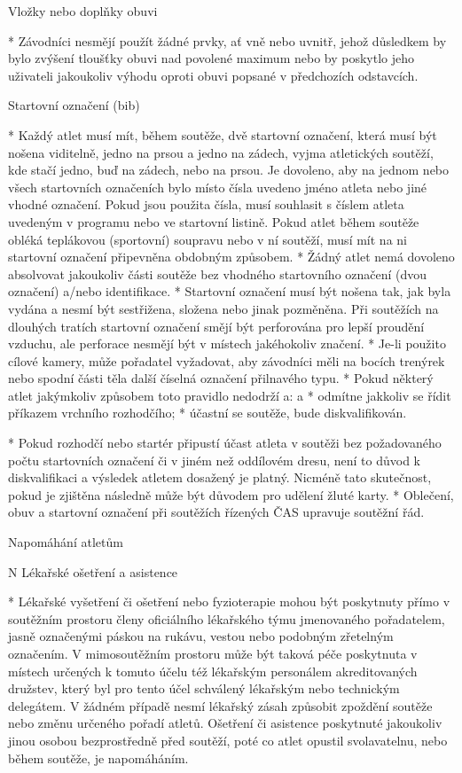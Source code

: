 Vložky nebo doplňky obuvi

* Závodníci nesmějí použít žádné prvky, ať vně nebo uvnitř, jehož důsledkem by bylo zvýšení tloušťky obuvi nad povolené maximum nebo by poskytlo jeho uživateli jakoukoliv výhodu oproti obuvi popsané v předchozích odstavcích.

Startovní označení (bib)

* Každý atlet musí mít, během soutěže, dvě startovní označení, která musí být nošena viditelně, jedno na prsou a jedno na zádech, vyjma atletických soutěží, kde stačí jedno, buď na zádech, nebo na prsou. Je dovoleno, aby na jednom nebo všech startovních označeních bylo místo čísla uvedeno jméno atleta nebo jiné vhodné označení. Pokud jsou použita čísla, musí souhlasit s číslem atleta uvedeným v programu nebo ve startovní listině. Pokud atlet během soutěže obléká  teplákovou (sportovní) soupravu nebo v ní soutěží, musí mít na ni startovní označení připevněna obdobným způsobem.
* Žádný atlet nemá dovoleno absolvovat jakoukoliv části soutěže bez vhodného startovního označení (dvou označení) a/nebo identifikace.
* Startovní označení musí být nošena tak, jak byla vydána a nesmí být sestřižena, složena nebo jinak pozměněna. Při soutěžích na dlouhých tratích startovní označení smějí být perforována pro lepší proudění vzduchu, ale perforace nesmějí být v místech jakéhokoliv značení.
* Je-li použito cílové kamery, může pořadatel vyžadovat, aby závodníci měli na bocích trenýrek nebo spodní části těla další číselná označení přilnavého typu.
* Pokud některý atlet jakýmkoliv způsobem toto pravidlo nedodrží a:
  \begitems \style a
  * odmítne jakkoliv se řídit příkazem vrchního rozhodčího;
  * účastní se soutěže,
  \enditems
bude diskvalifikován.

* Pokud rozhodčí nebo startér připustí účast atleta v soutěži bez požadovaného počtu startovních označení či v jiném než oddílovém dresu, není to důvod k diskvalifikaci a výsledek atletem dosažený je platný. Nicméně tato skutečnost, pokud je zjištěna následně může být důvodem pro udělení žluté karty.
* Oblečení, obuv a startovní označení při soutěžích řízených ČAS upravuje soutěžní řád.
\enditems

\secc Napomáhání atletům

\begitems \style N
Lékařské ošetření a asistence

* Lékařské vyšetření či ošetření nebo fyzioterapie mohou být poskytnuty přímo v soutěžním prostoru členy oficiálního lékařského týmu jmenovaného pořadatelem, jasně označenými páskou na rukávu, vestou nebo podobným zřetelným označením. V mimosoutěžním prostoru může být taková péče poskytnuta v místech určených k tomuto účelu též lékařským personálem akreditovaných družstev, který byl pro tento účel schválený lékařským nebo technickým delegátem. V žádném případě nesmí lékařský zásah způsobit zpoždění soutěže nebo změnu určeného pořadí atletů. Ošetření či asistence poskytnuté jakoukoliv jinou osobou bezprostředně před soutěží, poté co atlet opustil svolavatelnu, nebo během soutěže, je napomáháním.

